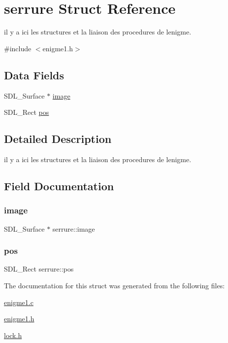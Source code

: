 \hypertarget{structserrure}{}\section{serrure Struct Reference}
\label{structserrure}


il y a ici les structures et la liaison des procedures de l\textquotesingle{}enigme.  




{\ttfamily \#include $<$enigme1.\+h$>$}

\subsection*{Data Fields}
\begin{DoxyCompactItemize}
\item 
S\+D\+L\+\_\+\+Surface $\ast$ \hyperlink{structserrure_a2bf4f397971a1bcebad46980e7bfedc0}{image}
\item 
S\+D\+L\+\_\+\+Rect \hyperlink{structserrure_a8cd1a53719ab1611f0332885c5a988d0}{pos}
\end{DoxyCompactItemize}


\subsection{Detailed Description}
il y a ici les structures et la liaison des procedures de l\textquotesingle{}enigme. 

\subsection{Field Documentation}
\mbox{\label{structserrure_a2bf4f397971a1bcebad46980e7bfedc0}} 
\subsubsection{\texorpdfstring{image}{image}}
{\footnotesize\ttfamily S\+D\+L\+\_\+\+Surface $\ast$ serrure\+::image}

\mbox{\label{structserrure_a8cd1a53719ab1611f0332885c5a988d0}} 
\subsubsection{\texorpdfstring{pos}{pos}}
{\footnotesize\ttfamily S\+D\+L\+\_\+\+Rect serrure\+::pos}



The documentation for this struct was generated from the following files\+:\begin{DoxyCompactItemize}
\item 
\hyperlink{enigme1_8c}{enigme1.\+c}\item 
\hyperlink{enigme1_8h}{enigme1.\+h}\item 
\hyperlink{lock_8h}{lock.\+h}\end{DoxyCompactItemize}
